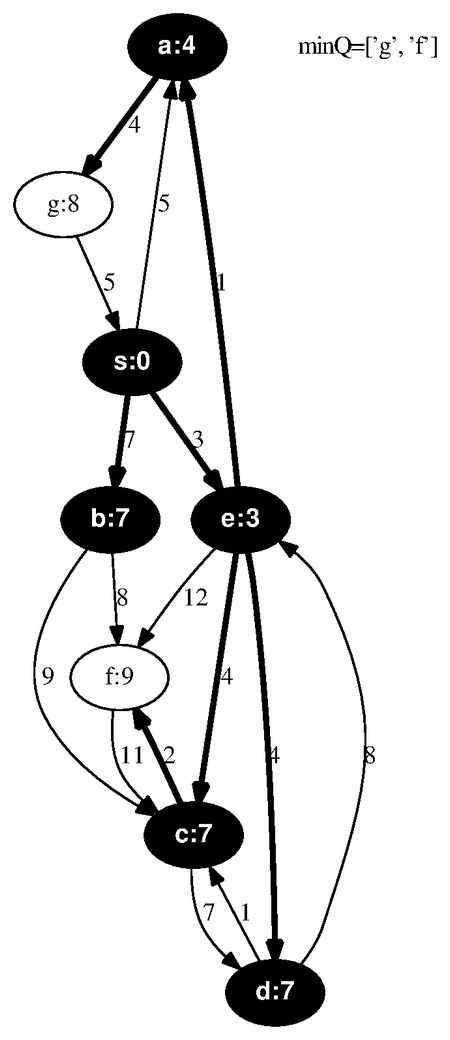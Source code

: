 \documentclass{article}
\begin{document}
\includegraphics[height=.3\textheight]{dijkstra_gross_yellen_06.eps}
\vspace{1em}
\end{document}
